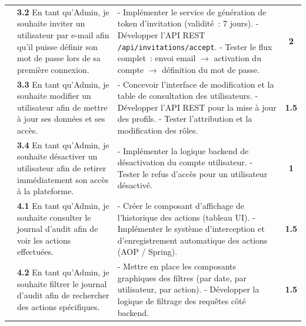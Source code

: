 \begin{small}
\begin{longtable}{|p{2.5cm}|p{6.0cm}|p{6.0cm}|c|}
& \textbf{3.2} En tant qu'Admin, je souhaite inviter un utilisateur par e-mail afin 
qu'il puisse définir son mot de passe lors de sa première connexion.
& - Implémenter le service de génération de token d'invitation (validité~: 7 jours).\newline
- Développer l'API REST \texttt{/api/invitations/accept}.\newline
- Tester le flux complet~: envoi email $\rightarrow$ activation du compte 
$\rightarrow$ définition du mot de passe.
& \textbf{2} \\ 

& \textbf{3.3} En tant qu'Admin, je souhaite modifier un utilisateur afin de mettre 
à jour ses données et ses accès.
& - Concevoir l'interface de modification et la table de consultation des utilisateurs.\newline
- Développer l'API REST pour la mise à jour des profils.\newline
- Tester l'attribution et la modification des rôles.
& \textbf{1.5} \\ 

& \textbf{3.4} En tant qu'Admin, je souhaite désactiver un utilisateur afin de 
retirer immédiatement son accès à la plateforme.
& - Implémenter la logique backend de désactivation du compte utilisateur.\newline
- Tester le refus d'accès pour un utilisateur désactivé.
& \textbf{1} \\ \hline

& \textbf{4.1} En tant qu'Admin, je souhaite consulter le journal d'audit afin de 
voir les actions effectuées.
& - Créer le composant d'affichage de l'historique des actions (tableau UI).\newline
- Implémenter le système d'interception et d'enregistrement automatique des 
actions (AOP / Spring).
& \textbf{1.5} \\ 

& \textbf{4.2} En tant qu'Admin, je souhaite filtrer le journal d'audit afin de 
rechercher des actions spécifiques.
& - Mettre en place les composants graphiques des filtres (par date, par utilisateur, 
par action).\newline
- Développer la logique de filtrage des requêtes côté backend.
& \textbf{1.5} \\ \hline


\end{longtable}
\end{small}
